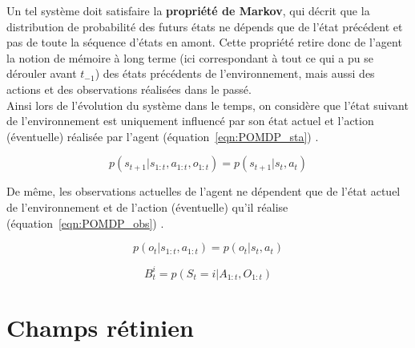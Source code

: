 Un tel système doit satisfaire la \textbf{propriété de Markov}, qui décrit que la distribution de probabilité des futurs états ne dépends que de l'état précédent et pas de toute la séquence d'états en amont. Cette propriété retire donc de l'agent la notion de mémoire à long terme (ici correspondant à tout ce qui a pu se dérouler avant $t_{-1}$) des états précédents de l'environnement, mais aussi des actions et des observations réalisées dans le passé.\\
Ainsi lors de l'évolution du système dans le temps, on considère que l'état suivant de l'environnement est uniquement influencé par son état actuel et l'action (éventuelle) réalisée par l'agent (équation~\ref{eqn:POMDP_sta}) \autocite{Butko2010}. 

\begin{equation}
p(s_{t+1}|s_{1:t},a_{1:t},o_{1:t}) = p(s_{t+1}|s_{t},a_{t})
\label{eqn:POMDP_sta}
\end{equation}

De même, les observations actuelles de l'agent ne dépendent que de l'état actuel de l'environnement et de l'action (éventuelle) qu'il réalise (équation~\ref{eqn:POMDP_obs}) \autocite{Butko2010}.

\begin{equation}
p(o_{t}|s_{1:t},a_{1:t}) = p(o_{t}|s_{t},a_{t})
\label{eqn:POMDP_obs}
\end{equation}

\begin{equation}
B_{t}^i = p(S_{t} = i|A_{1:t},O_{1:t})
\label{eqn:POMDP_bel}
\end{equation}


\section{Champs rétinien} %

